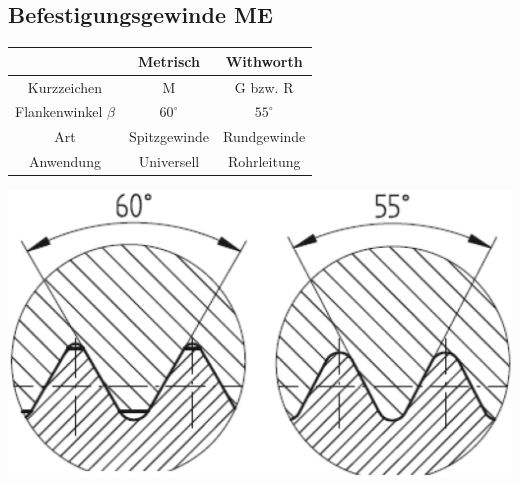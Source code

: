 \subsection{Befestigungsgewinde \hfill ME}
\begin{minipage}{0.58\linewidth}
    \begin{center}
        \begin{scriptsize}
            \begin{tabular}{|c|c|c|}
            \hline
            \null & \cellcolor{Yellow}Metrisch & \cellcolor{Apricot}Withworth\\
            \hline
            Kurzzeichen & M & G bzw. R \\
            \hline
            Flankenwinkel $\beta$ & $60^\circ$ & $55^\circ$ \\
            \hline
            Art & Spitzgewinde & Rundgewinde \\
            \hline
            Anwendung & Universell & Rohrleitung\\
            \hline
        \end{tabular}
        \end{scriptsize}
    \end{center}
\end{minipage}
\begin{minipage}{0.4\linewidth}
    \begin{center}
        \includegraphics[width = 0.9\linewidth]{src/images/MAEIP_BG}
    \end{center}
\end{minipage}